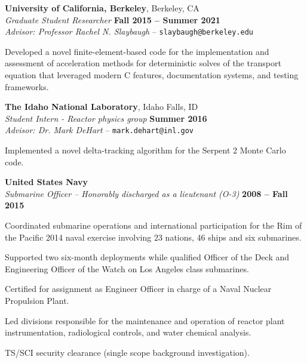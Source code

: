 \documentclass[margin,line]{resume}
\newcommand{\Cpp}[1][]{\textrm{C\nolinebreak[4]\hspace{-.05em}\raisebox{.4ex}{\tiny\bfseries++}#1}}
\begin{document}
\begin{resume}
\begin{list2}
\begin{list2}
                \end{list2}
                \end{list2}
    \textbf{University of California, Berkeley}, Berkeley, CA\\
                \textsl{Graduate Student Researcher} \hfill
                \textbf{Fall 2015 -- Summer 2021}\\
                \textsl{Advisor: Professor Rachel N. Slaybaugh} -- \verb`slaybaugh@berkeley.edu`
                \begin{list2}
                \item[]                 Developed a novel finite-element-based code for the implementation and
                assessment of acceleration methods for deterministic
                solves of the transport
                equation that leveraged modern \Cpp{} features, documentation systems, and testing frameworks.
                \end{list2}

    \textbf{The Idaho National Laboratory}, Idaho Falls, ID \\
                \textsl{Student Intern - Reactor physics group} \hfill
                \textbf{Summer 2016}\\
                \textsl{Advisor: Dr. Mark DeHart} --
                \verb`mark.dehart@inl.gov`
                \begin{list2}
                \item[] Implemented a novel delta-tracking algorithm for the Serpent 2 Monte Carlo code.
                \end{list2}
    \textbf{United States Navy} \\
    \textsl{Submarine Officer -- Honorably discharged as a lieutenant (O-3)} \hfill \textbf{2008 -- Fall 2015}
    \\\vspace{-3mm}
    \begin{list2}
    \item Coordinated submarine operations and international
      participation for the Rim of the Pacific 2014 naval exercise
      involving 23 nations, 46 ships and six submarines.
    \item Supported two six-month deployments while qualified Officer
      of the Deck and Engineering Officer of the Watch on Los Angeles class submarines.
    \item Certified for assignment as Engineer Officer in charge of a Naval Nuclear Propulsion Plant.
    \item Led divisions responsible for the maintenance and operation of reactor plant instrumentation, radiological controls, and water chemical analysis.
      \item TS/SCI security clearance (single scope background investigation).
          \end{list2}
                

\end{resume}
\end{document}
